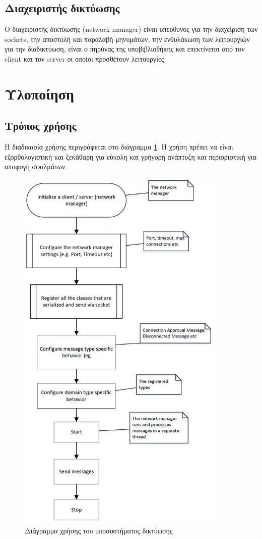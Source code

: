 		\subsection{Διαχειριστής δικτύωσης}
		Ο διαχειριστής δικτύωσης (network manager) είναι υπεύθυνος για την διαχείριση των sockets, την αποστολή και παραλαβή μηνυμάτων, την ενθυλάκωση των λειτουργιών για την διαδικτύωση, είναι ο πηρύνας της υποβιβλιοθήκης και επεκτίνεται από τον client και τον server οι οποίοι προσθέτουν λειτουργίες.
			
		\section{Υλοποίηση}	
		\subsection{Τρόπος χρήσης}
		Η διαδικασία χρήσης περιγράφεται στο διάγραμμα \ref{fig:Network_Usage_Diagram}. Η χρήση πρέπει να είναι εξορθολογιστική και ξεκάθαρη για εύκολη και γρήγορη ανάπτυξη και περιοριστική για αποφυγή σφαλμάτων.
		\begin{figure}
			\centering
			\includegraphics[width=100mm]{Images/network_usage_diagram}
			\caption{Διάγραμμα χρήσης του υποσυστήματος δικτύωσης}
			\label{fig:Network_Usage_Diagram}
		\end{figure}	
					
